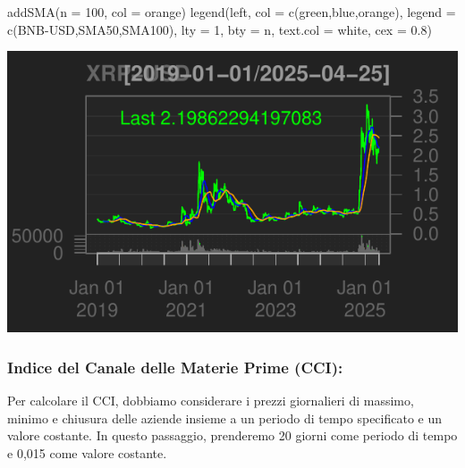 \documentclass[]{tufte-handout}
\newenvironment{Shaded}{}{}
\newcommand{\AttributeTok}[1]{\textcolor[rgb]{0.49,0.56,0.16}{#1}}
\newcommand{\DecValTok}[1]{\textcolor[rgb]{0.25,0.63,0.44}{#1}}
\newcommand{\FloatTok}[1]{\textcolor[rgb]{0.25,0.63,0.44}{#1}}
\newcommand{\FunctionTok}[1]{\textcolor[rgb]{0.02,0.16,0.49}{#1}}
\newcommand{\NormalTok}[1]{#1}
\newcommand{\StringTok}[1]{\textcolor[rgb]{0.25,0.44,0.63}{#1}}
\begin{document}
\begin{Shaded}
\begin{Highlighting}[]
\FunctionTok{addSMA}\NormalTok{(}\AttributeTok{n =} \DecValTok{100}\NormalTok{, }\AttributeTok{col =} \StringTok{\textquotesingle{}orange\textquotesingle{}}\NormalTok{)}
\FunctionTok{legend}\NormalTok{(}\StringTok{\textquotesingle{}left\textquotesingle{}}\NormalTok{, }\AttributeTok{col =} \FunctionTok{c}\NormalTok{(}\StringTok{\textquotesingle{}green\textquotesingle{}}\NormalTok{,}\StringTok{\textquotesingle{}blue\textquotesingle{}}\NormalTok{,}\StringTok{\textquotesingle{}orange\textquotesingle{}}\NormalTok{),}
       \AttributeTok{legend =} \FunctionTok{c}\NormalTok{(}\StringTok{\textquotesingle{}BNB{-}USD\textquotesingle{}}\NormalTok{,}\StringTok{\textquotesingle{}SMA50\textquotesingle{}}\NormalTok{,}\StringTok{\textquotesingle{}SMA100\textquotesingle{}}\NormalTok{), }\AttributeTok{lty =} \DecValTok{1}\NormalTok{, }\AttributeTok{bty =} \StringTok{\textquotesingle{}n\textquotesingle{}}\NormalTok{,}
       \AttributeTok{text.col =} \StringTok{\textquotesingle{}white\textquotesingle{}}\NormalTok{, }\AttributeTok{cex =} \FloatTok{0.8}\NormalTok{)}
\end{Highlighting}
\end{Shaded}

\includegraphics{cripto_update_files/figure-latex/unnamed-chunk-9-3}

\subsubsection{Indice del Canale delle Materie Prime
(CCI):}\label{indice-del-canale-delle-materie-prime-cci}

Per calcolare il CCI, dobbiamo considerare i prezzi giornalieri di
massimo, minimo e chiusura delle aziende insieme a un periodo di tempo
specificato e un valore costante. In questo passaggio, prenderemo 20
giorni come periodo di tempo e 0,015 come valore costante.
\end{document}
